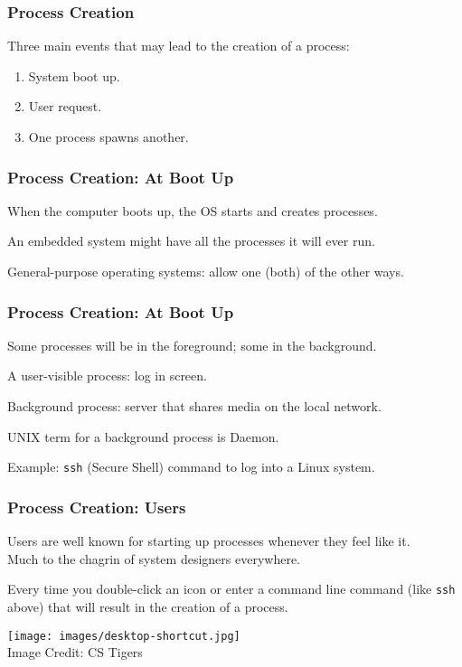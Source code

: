 \begin{frame}
	\frametitle{Process Creation}

	Three main events that may lead to the creation of a process:

	\begin{enumerate}
		\item System boot up.
		\item User request.
		\item One process spawns another.
	\end{enumerate}


\end{frame}

\begin{frame}
	\frametitle{Process Creation: At Boot Up}

	When the computer boots up, the OS starts and creates processes.

	An embedded system might have all the processes it will ever run.

	General-purpose operating systems: allow one (both) of the other ways.


\end{frame}

\begin{frame}
	\frametitle{Process Creation: At Boot Up}

	Some processes will be in the foreground; some in the background.

	A user-visible process: log in screen.

	Background process: server that shares media on the local network.

	UNIX term for a background process is \alert{Daemon}.

	Example: \texttt{ssh} (Secure Shell) command to log into a Linux system.


\end{frame}

\begin{frame}
	\frametitle{Process Creation: Users}

	Users are well known for starting up processes whenever they feel like it.\\
	\quad Much to the chagrin of system designers everywhere.

	Every time you double-click an icon or enter a command line command (like \texttt{ssh} above) that will result in the creation of a process.


	\begin{center}
		\texttt{[image: images/desktop-shortcut.jpg]}\\
		Image Credit: CS Tigers
	\end{center}

\end{frame}

